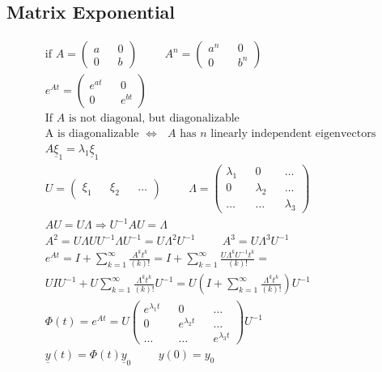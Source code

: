 \documentclass[fleqn]{report}
\newcommand{\hp}{\hspace{1cm}}
\newcommand{\equations} [1] {
\begin{gather*}
#1
\end{gather*}
}
\begin{document}
\subsection{Matrix Exponential}
\equations{
\textrm{if } A = 
\begin{pmatrix}
a && 0 \\
0 && b
\end{pmatrix}
\hp
A^n = 
\begin{pmatrix}
a^n && 0 \\
0 && b^n
\end{pmatrix}
\\
e^{A t} = 
\begin{pmatrix}
e^{at} && 0 \\
0 && e^{bt}
\end{pmatrix}
\\
\textrm{If $A$ is not diagonal, but diagonalizable}
\\
\textrm{A is diagonalizable $\iff$ $A$ has $n$ linearly independent eigenvectors}
\\
A \underline \xi_1 = \lambda_1 \underline \xi_1
\\
U
=
\begin{pmatrix}
\xi_1 && \xi_2 && \ldots 
\end{pmatrix}
\hp
\Lambda = 
\begin{pmatrix}
\lambda_1 && 0 && \ldots \\
0 && \lambda_2 && \ldots \\
\ldots && \ldots && \lambda_3
\end{pmatrix}
\\
A U = U \Lambda
\Longrightarrow
U^{-1} A U = \Lambda
\\
A^2 = U \Lambda U U^{-1} \Lambda U^{-1} = U \Lambda^2 U^{-1}
\hp
A^3 = U \Lambda^3 U^{-1}
\\
e^{A t} = I + \sum^{\infty}_{k = 1} \frac{A^{k} t^{k} } { (k)! } 
=
I + \sum^{\infty}_{k = 1} \frac{U \Lambda^{k} U^{-1} t^{k} } { (k)! } 
=
\\
U I U^{-1} + U \sum^{\infty}_{k = 1} \frac{\Lambda^{k} t^{k} } { (k)! } U^{-1}
=
U \left( I + \sum^{\infty}_{k = 1} \frac{\Lambda^{k} t^{k} } { (k)! } \right) U^{-1}
\\
\Phi (t) = e^{A t} = U 
\begin{pmatrix}
e^{\lambda_{1} t} && 0 && \ldots \\
0 && e^{\lambda_{2} t} && \ldots \\
\ldots && \ldots && e^{\lambda_{3} t}
\end{pmatrix}
U^{-1}
\\
\underline y(t) = \Phi (t) \underline y_0
\hp
y(0) = y_0
}
\end{document}
